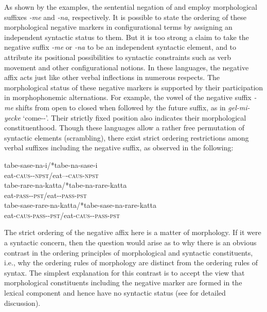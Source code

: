 \documentclass[output=paper
 	        ,biblatex
                ,babelshorthands
                ,newtxmath
                ,draftmode
                ,colorlinks, citecolor=brown
]{langscibook}
\begin{document}
\begin{exe}
\begin{xlist}
\begin{exe}
\begin{xlist}
\noindent
As shown by the examples, the sentential negation of  and  employ
morphological suffixes \textit{-me} and \textit{-na}, respectively.  It is possible to state the
ordering of these morphological negative markers in configurational terms by assigning an
independent syntactic status to them.  But it is too strong a claim to take the negative suffix
\textit{-me} or \textit{-na} to be an independent syntactic element, and to attribute its positional
possibilities to syntactic constraints such as verb movement and other configurational notions.  In
these languages, the negative affix acts just like other verbal inflections in numerous respects.
The morphological status of these negative markers is supported by their participation in
morphophonemic alternations.  For example, the vowel of the  negative suffix
\textit{-me} shifts from open to closed when followed by the future suffix, as in
\textit{gel-mi-yecke} `come-\NEG-\FUT'.  Their strictly fixed position also indicates their
morphological constituenthood. Though these languages allow a rather free permutation of syntactic
elements (scrambling), there exist strict ordering restrictions among verbal suffixes including the
negative suffix, as observed in the following:

\eal
\ex
\gll tabe-sase-na-i/*tabe-na-sase-i \\
     eat-\textsc{caus}-\NEG-\textsc{npst}/eat--\NEG-\textsc{caus}-\textsc{npst} \\

\ex
\gll tabe-rare-na-katta/*tabe-na-rare-katta \\
     eat-\textsc{pass}-\NEG-\textsc{pst}/eat-\NEG-\textsc{pass}-\textsc{pst} \\

\ex
\gll tabe-sase-rare-na-katta/*tabe-sase-na-rare-katta \\
     eat-\textsc{caus}-\textsc{pass}-\NEG-\textsc{pst}/eat-\textsc{caus}-\NEG-\textsc{pass}-\textsc{pst}\\
\zl

\noindent
The strict ordering of the negative affix here is a matter of morphology.
If it were a syntactic concern, then
the question would arise as to why
there is an obvious contrast in the ordering principles
of morphological and syntactic constituents, i.e., why the ordering
rules of morphology are distinct from the ordering rules of syntax. The
simplest explanation for this contrast is to accept
the view that morphological constituents including the negative marker
are formed in the lexical component and hence have no syntactic
status (see \citealt[Chapter~2]{Kim:00} for detailed discussion).


\end{xlist}
\end{exe}
\end{xlist}
\end{exe}
\end{document}
